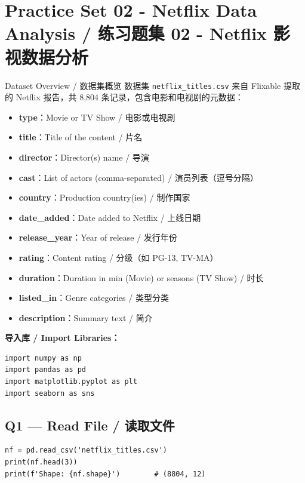 \documentclass[11pt,a4paper]{report}
\let\oldtexttt\texttt
\renewcommand{\texttt}[1]{\textcolor{mainblue}{\oldtexttt{#1}}}
\begin{document}
\newpage

\chapter{Practice Set 02 - Netflix Data Analysis / 练习题集 02 - Netflix 影视数据分析}

\begin{concept}{Dataset Overview / 数据集概览}
    数据集 \texttt{netflix\_titles.csv} 来自 Flixable 提取的 Netflix 报告，共 8,804 条记录，包含电影和电视剧的元数据：
    \begin{itemize}[itemsep=0.2em]
        \item \textbf{type}：Movie or TV Show / 电影或电视剧
        \item \textbf{title}：Title of the content / 片名
        \item \textbf{director}：Director(s) name / 导演
        \item \textbf{cast}：List of actors (comma-separated) / 演员列表（逗号分隔）
        \item \textbf{country}：Production country(ies) / 制作国家
        \item \textbf{date\_added}：Date added to Netflix / 上线日期
        \item \textbf{release\_year}：Year of release / 发行年份
        \item \textbf{rating}：Content rating / 分级（如 PG-13, TV-MA）
        \item \textbf{duration}：Duration in min (Movie) or seasons (TV Show) / 时长
        \item \textbf{listed\_in}：Genre categories / 类型分类
        \item \textbf{description}：Summary text / 简介
    \end{itemize}
\end{concept}

\noindent\textbf{导入库 / Import Libraries：}
\begin{lstlisting}
import numpy as np
import pandas as pd
import matplotlib.pyplot as plt
import seaborn as sns
\end{lstlisting}

\section*{Q1 — Read File / 读取文件}
\begin{lstlisting}
nf = pd.read_csv('netflix_titles.csv')
print(nf.head(3))
print(f'Shape: {nf.shape}')        # (8804, 12)
\end{lstlisting}
\end{document}
